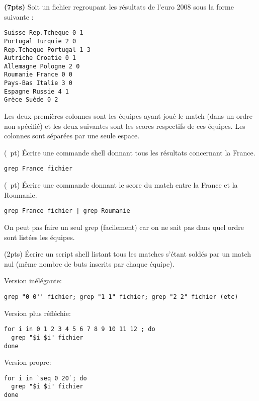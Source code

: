\documentclass[10pt]{article}
\begin{document}
\medskip
\begin{Exercice} \textbf{(7pts)} Soit un fichier regroupant les résultats de
  l'euro 2008 sous la forme suivante :

  \noindent
  \begin{minipage}{.3\linewidth}
  \begin{Verbatim}
Suisse Rep.Tcheque 0 1
Portugal Turquie 2 0
Rep.Tcheque Portugal 1 3  
Autriche Croatie 0 1
Allemagne Pologne 2 0
Roumanie France 0 0
Pays-Bas Italie 3 0
Espagne Russie 4 1
Grèce Suède 0 2
  \end{Verbatim}    
  \end{minipage}\hfill%
  \begin{minipage}{.68\linewidth}
  Les deux premières colonnes sont les équipes ayant joué le match (dans un
  ordre non spécifié) et les deux suivantes sont les scores respectifs de ces
  équipes. Les colonnes sont séparées par une seule espace.
  \end{minipage}

  \Question (\textonehalf~pt) Écrire une commande shell donnant tous les
  résultats concernant la France.

\begin{Reponse}
  \begin{Verbatim}
grep France fichier    
  \end{Verbatim}
\end{Reponse}

\Question (\textonehalf~pt) Écrire une commande donnant le score du match
entre la France et la Roumanie.

\begin{Reponse}
  \begin{Verbatim}
grep France fichier | grep Roumanie 
  \end{Verbatim}
 On peut pas faire un seul grep (facilement) car on ne sait pas dans quel ordre
 sont listées les équipes.
\end{Reponse}

\Question (2pts) Écrire un script shell listant tous les matches s'étant soldés
par un match nul (même nombre de buts inscrits par chaque équipe).

\begin{Reponse}
  Version inélégante: 
  \begin{Verbatim}
grep "0 0'' fichier; grep "1 1" fichier; grep "2 2" fichier (etc)
  \end{Verbatim}
  Version plus réfléchie:
  \begin{Verbatim}
for i in 0 1 2 3 4 5 6 7 8 9 10 11 12 ; do
  grep "$i $i" fichier
done    
  \end{Verbatim}
  Version propre:
  \begin{Verbatim}
for i in `seq 0 20`; do
  grep "$i $i" fichier
done    
  \end{Verbatim}
\end{Reponse}


\end{Exercice}
\end{document}
